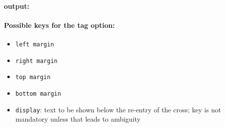 \documentclass[parskip=half-]{scrartcl}
\begin{document}
\makeatletter
\def\form@print@inject{
    \put(\form@array@get{form@vert@hpos}[1],\dimexpr\form@bottom-\form@array@get{form@reentry@vpos}[1]-1ex){\scalebox{0.2}{\color{red}\line(1,0){5\dimexpr\form@array@get{form@margin@tag@left}[0]}}}
    \put(\form@array@get{form@vert@hpos}[1],\dimexpr\form@bottom-\form@array@get{form@reentry@vpos}[1]-1ex-1pt){\scalebox{0.1}{\color{red}left margin}}
    \put(\dimexpr0.5\dimexpr\form@array@get{form@vert@hpos}[1]+\form@array@get{form@vert@hpos}[2],\dimexpr\form@bottom-\form@array@get{form@reentry@vpos}[1]){\scalebox{0.2}{\color{red}\line(0,-1){5\dimexpr\form@array@get{form@margin@tag@top}[0]}}}
    \put(\dimexpr0.2pt+0.5\dimexpr\form@array@get{form@vert@hpos}[1]+\form@array@get{form@vert@hpos}[2],\dimexpr\form@bottom-\form@array@get{form@reentry@vpos}[1]-1.2pt){\scalebox{0.1}{\color{red}top margin}}
    \put(\form@array@get{form@vert@hpos}[2],\dimexpr\form@bottom-\form@array@get{form@reentry@vpos}[1]-1ex){\scalebox{0.2}{\color{red}\line(-1,0){5\dimexpr\form@array@get{form@margin@tag@right}[0]}}}
    \put(\dimexpr\form@array@get{form@vert@hpos}[2]-\form@array@get{form@margin@tag@right}[0],\dimexpr\form@bottom-\form@array@get{form@reentry@vpos}[1]-1ex-1pt){\scalebox{0.1}{\color{red}right margin}}
    \put(\dimexpr0.5\dimexpr\form@array@get{form@vert@hpos}[1]+\form@array@get{form@vert@hpos}[2],\dimexpr\form@bottom-\form@array@get{form@tag@bottom}[1]){\scalebox{0.2}{\color{red}\line(0,1){5\dimexpr\form@array@get{form@margin@tag@bottom}[0]}}}
    \put(\dimexpr0.2pt+0.5\dimexpr\form@array@get{form@vert@hpos}[1]+\form@array@get{form@vert@hpos}[2],\dimexpr\form@bottom-\form@array@get{form@tag@bottom}[1]+1.2pt){\scalebox{0.1}{\color{red}bottom margin}}
}
\makeatother

\paragraph{output:}
\begin{center}
\end{center}

\paragraph{Possible keys for the tag option:}
\begin{itemize}
    \item \verb|left margin|
    \item \verb|right margin|
    \item \verb|top margin|
    \item \verb|bottom margin|
    \item \verb|display|: text to be shown below the re-entry of the cross; key is not mandatory unless that leads to ambiguity
\end{itemize}
\end{document}
